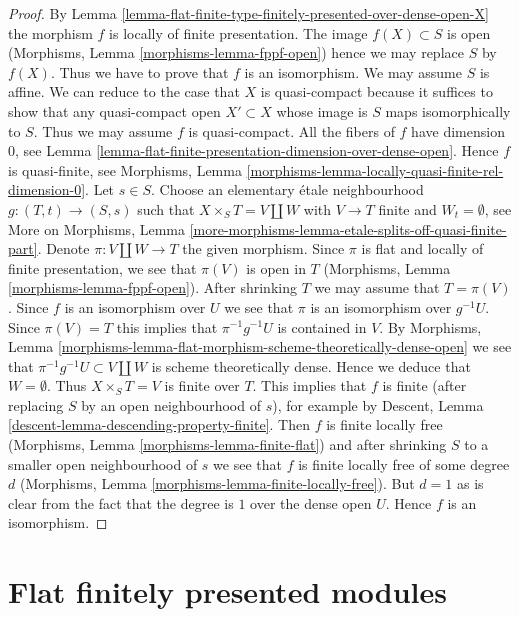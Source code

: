 \begin{proof}
By Lemma \ref{lemma-flat-finite-type-finitely-presented-over-dense-open-X}
the morphism $f$ is locally of finite presentation.
The image $f(X) \subset S$ is open
(Morphisms, Lemma \ref{morphisms-lemma-fppf-open})
hence we may replace $S$ by $f(X)$. Thus we have to prove that
$f$ is an isomorphism. We may assume $S$ is affine. We can reduce
to the case that $X$ is quasi-compact because it suffices to show
that any quasi-compact open $X' \subset X$ whose image is $S$
maps isomorphically to $S$. Thus we may assume $f$ is quasi-compact.
All the fibers of $f$ have dimension $0$, see
Lemma \ref{lemma-flat-finite-presentation-dimension-over-dense-open}.
Hence $f$ is quasi-finite, see
Morphisms, Lemma \ref{morphisms-lemma-locally-quasi-finite-rel-dimension-0}.
Let $s \in S$. Choose an elementary \'etale
neighbourhood $g : (T, t) \to (S, s)$ such that $X \times_S T = V \amalg W$
with $V \to T$ finite and $W_t = \emptyset$, see
More on Morphisms, Lemma
\ref{more-morphisms-lemma-etale-splits-off-quasi-finite-part}.
Denote $\pi : V \amalg W \to T$ the given morphism. Since $\pi$ is
flat and locally of finite presentation, we see that $\pi(V)$ is
open in $T$ (Morphisms, Lemma \ref{morphisms-lemma-fppf-open}).
After shrinking $T$ we may assume that $T = \pi(V)$.
Since $f$ is an isomorphism over $U$ we see that $\pi$ is an
isomorphism over $g^{-1}U$. Since $\pi(V) = T$ this implies
that $\pi^{-1}g^{-1}U$ is contained in $V$.
By Morphisms, Lemma
\ref{morphisms-lemma-flat-morphism-scheme-theoretically-dense-open}
we see that $\pi^{-1}g^{-1}U \subset V \amalg W$ is scheme theoretically
dense. Hence we deduce that $W = \emptyset$.
Thus $X \times_S T = V$ is finite over $T$.
This implies that $f$ is finite (after replacing $S$ by an
open neighbourhood of $s$), for example by
Descent, Lemma \ref{descent-lemma-descending-property-finite}.
Then $f$ is finite locally free
(Morphisms, Lemma \ref{morphisms-lemma-finite-flat})
and after shrinking $S$ to a smaller open neighbourhood of $s$
we see that $f$ is finite locally free of some degree $d$
(Morphisms, Lemma \ref{morphisms-lemma-finite-locally-free}).
But $d = 1$ as is clear from the fact that the degree is $1$ over
the dense open $U$. Hence $f$ is an isomorphism.
\end{proof}





\section{Flat finitely presented modules}
\label{section-finitely-presented-flat}

